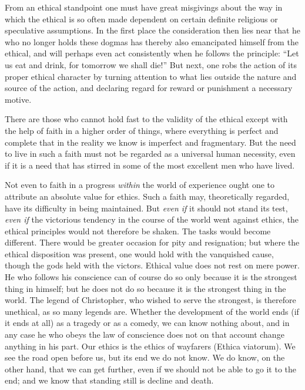 \documentclass[12pt,a4paper,openany]{book}
\newcommand{\opage}[1]{\marginnote{\footnotesize\textit{[#1]}}}
\begin{document}
From an ethical standpoint one must have great misgivings about the way in which the ethical is so often
made dependent on certain definite religious or speculative assumptions. In the first place the
consideration then lies near that he who no longer holds these dogmas has thereby also emancipated
himself from the ethical, and will perhaps even act consistently when he follows the principle: ``Let us
eat and drink, for tomorrow we shall die!'' But next, one robs the action of its proper ethical character
by turning attention to what lies outside the nature and source of the action, and declaring regard for
reward or punishment a necessary motive.

There are those who cannot hold fast to the validity of the ethical except with the help of faith in a
higher order of things, where everything is perfect and complete that in the reality we know is imperfect
and fragmentary. But the need to live in such a faith must not be regarded as a universal human
necessity, even if it is a need that has stirred in some of the most excellent men who have lived.

Not even to faith in a progress \textit{within} the world of experience ought one to attribute an absolute
value for ethics. Such a faith may, theoretically regarded, have its difficulty in being maintained. But
\textit{even if} it should not stand its test, \textit{even if} the victorious tendency in the course of
the world went against ethics, the ethical principles would not therefore be shaken. The tasks would
become different. There would be greater occasion for pity and resignation; but where the ethical
disposition was present, one would hold with the vanquished cause, though the gods held with the victors.
Ethical value does not rest on mere power. He who follows his conscience can of course do so only because
it is the strongest thing in himself; but he does not do so
\opage{100}because it is the strongest thing in the world.
The legend of Christopher, who wished to serve the strongest, is therefore unethical, as so many legends
are. Whether the development of the world ends (if it ends at all) as a tragedy or as a comedy, we can
know nothing about, and in any case he who obeys the law of conscience does not on that account change
anything in his part. Our ethics is the ethics of wayfarers (Ethica viatorum). We see the road open
before us, but its end we do not know. We do know, on the other hand, that we can get further, even if
we should not be able to go it to the end; and we know that standing still is decline and death.
\end{document}
